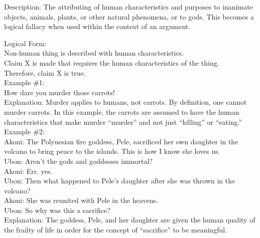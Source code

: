 \documentclass[a4paper,12pt,single,pdftex]{scrbook}
\begin{document}
  
    Description: The attributing of human characteristics and purposes to inanimate objects, animals, plants, or other natural phenomena, or to gods. This becomes a logical fallacy when used within the context of an argument.

    
      Logical Form:
    \\

    
      Non-human thing is described with human characteristics.
    \\

    
      Claim X is made that requires the human characteristics of the thing.
    \\

    
      Therefore, claim X is true.
    \\

    
      Example \#1:
    \\

    
      How dare you murder those carrots!
    \\

    
      Explanation: Murder applies to humans, not carrots. By definition, one cannot murder carrots. In this example, the carrots are assumed to have the human characteristics that make murder “murder” and not just “killing” or “eating.”
    \\

    
      Example \#2:
    \\

    
      Akoni: The Polynesian fire goddess, Pele, sacrificed her own daughter in the volcano to bring peace to the islands. This is how I know she loves us.
    \\

    
      Ubon: Aren't the gods and goddesses immortal?
    \\

    
      Akoni: Err, yes.
    \\

    
      Ubon: Then what happened to Pele's daughter after she was thrown in the volcano?
    \\

    
      Akoni: She was reunited with Pele in the heavens.
    \\

    
      Ubon: So why was this a sacrifice?
    \\

    
      Explanation: The goddess, Pele, and her daughter are given the human quality of the frailty of life in order for the concept of “sacrifice” to be meaningful.
    \\
\end{document}
